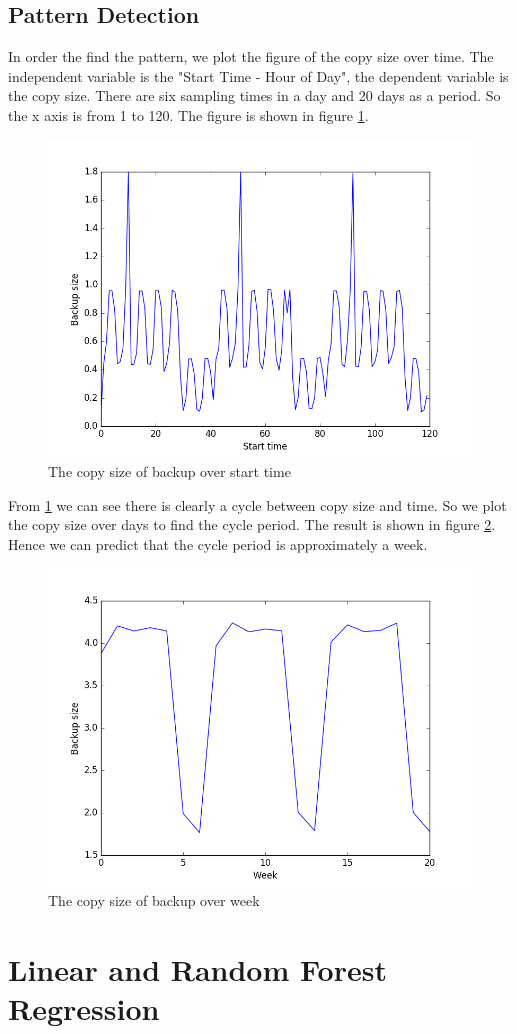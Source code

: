 \documentclass{article}
\begin{document}
\subsection{Pattern Detection}
In order the find the pattern, we plot the figure of the copy size over time. The independent variable is the "Start Time - Hour of Day", the dependent variable is the copy size. There are six sampling times in a day and 20 days as a period. So the x axis is from 1 to 120. The figure is shown in figure \ref{fig:start_time}.
\begin{figure}[htbp]
\centering
\includegraphics[width=.6\textwidth]{pattern_start.png}
\caption{The copy size of backup over start time}
\label{fig:start_time}
\end{figure}
From \ref{fig:start_time} we can see there is clearly a cycle between copy size and time. So we plot the copy size over days to find the cycle period. The result is shown in figure \ref{fig:day}. Hence we can predict that the cycle period is approximately a week.
\begin{figure}[htbp]
\centering
\includegraphics[width=.6\textwidth]{pattern_week.png}
\caption{The copy size of backup over week}
\label{fig:day}
\end{figure}
\section{Linear and Random Forest Regression}
\end{document}
